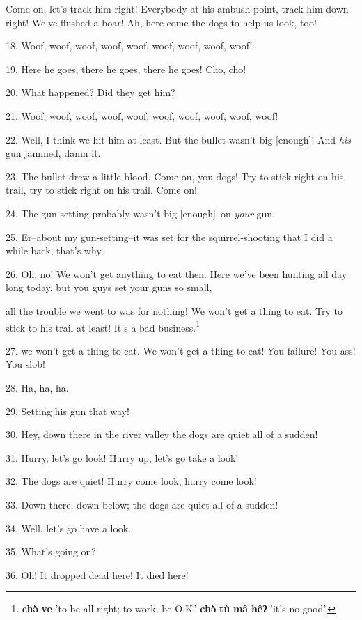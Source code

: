 Come on, let's track him right! Everybody at his ambush-point, track him down right!
We've flushed a boar! Ah, here come the dogs to help us look, too!

18. Woof, woof, woof, woof, woof, woof, woof, woof, woof!

19. Here he goes, there he goes, there he goes! Cho, cho!


20. What happened? Did they get him?

21. Woof, woof, woof, woof, woof, woof, woof, woof, woof, woof!

22. Well, I think we hit him at least. But the bullet wasn't big [enough]! And
\textit{his} gun jammed, damn it.

23. The bullet drew a little blood. Come on, you dogs! Try to stick right on his
trail, try to stick right on his trail. Come on!

24. The gun-setting probably wasn't big [enough]--on \textit{your} gun.

25. Er--about my gun-setting--it was set for the squirrel-shooting that I did a
while back, that's why.

26. Oh, no! We won't get anything to eat then. Here we've been hunting all day
long today, but you guys set your guns so small,

all the trouble we went to was for nothing! We won't get a thing to eat. Try to
stick to his trail at least! It's a bad business.\footnote{\textbf{chə̀} \textbf{ve} 'to be all right; to work; be O.K.' \textbf{chə̀} \textbf{tù} \textbf{mâ} \textbf{hêʔ} 'it's no good'.}

27. we won't get a thing to eat. We won't get a thing to eat! You failure! You
ass! You slob!

28. Ha, ha, ha.

29. Setting his gun that way!

30. Hey, down there in the river valley the dogs are quiet all of a sudden!

31. Hurry, let's go look! Hurry up, let's go take a look!

32. The dogs are quiet! Hurry come look, hurry come look!

33. Down there, down below; the dogs are quiet all of a sudden!

34. Well, let's go have a look.

35. What's going on?

36. Oh! It dropped dead here! It died here!

